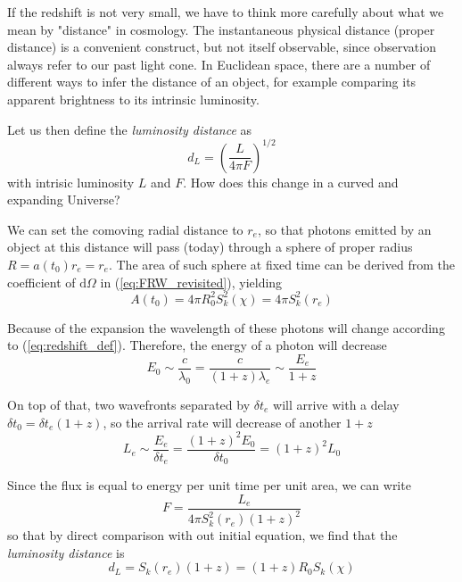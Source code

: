 If the redshift is not very small, we have to think more carefully about what we mean by "distance" in cosmology. The instantaneous physical distance (proper distance) is a convenient construct, but not itself observable, since observation always refer to our past light cone. In Euclidean space, there are a number of different ways to infer the distance of an object, for example comparing its apparent brightness to its intrinsic luminosity.
\par Let us then define the \emph{luminosity distance} as
\begin{equation*}
    d_{L} = \left(\frac{L}{4\pi F}\right)^{1/2}
\end{equation*}
with intrisic luminosity $L$ and $F$. How does this change in a curved and expanding Universe?
\par We can set the comoving radial distance to $r_{e}$, so that photons emitted by an object at this distance will pass (today) through a sphere of proper radius $R = a(t_{0})r_{e} = r_{e}$. The area of such sphere at fixed time can be derived from the coefficient of $\text{d}\Omega$ in (\ref{eq:FRW_revisited}), yielding
\begin{equation*}
    A(t_{0}) = 4\pi R_{0}^{2}S_{k}^{2}(\chi) = 4\pi S_{k}^{2}(r_{e})
\end{equation*}
\par Because of the expansion the wavelength of these photons will change according to (\ref{eq:redshift_def}). Therefore, the energy of a photon will decrease
\begin{equation*}
    E_{0} \sim \frac{c}{\lambda_{0}} = \frac{c}{(1+z)\lambda_{e}} \sim \frac{E_{e}}{1+z}
\end{equation*}
\par On top of that, two wavefronts separated by $\delta t_{e}$ will arrive with a delay $\delta t_{0} = \delta t_{e}(1+z)$, so the arrival rate will decrease of another $1+z$
\begin{equation*}
    L_{e} \sim \frac{E_{e}}{\delta t_{e}} = \frac{(1+z)^{2}E_{0}}{\delta t_{0}} = (1+z)^{2}L_{0}
\end{equation*}
\par Since the flux is equal to energy per unit time per unit area, we can write
\begin{equation*}
    F = \frac{L_{e}}{4\pi S_{k}^{2}(r_{e})(1+z)^{2}}
\end{equation*}
so that by direct comparison with out initial equation, we find that the \emph{luminosity distance} is
\begin{equation}
    d_{L} = S_{k}(r_{e})(1+z) = (1+z)R_{0}S_{k}(\chi)
    \label{eq:luminositydistance}
\end{equation}
